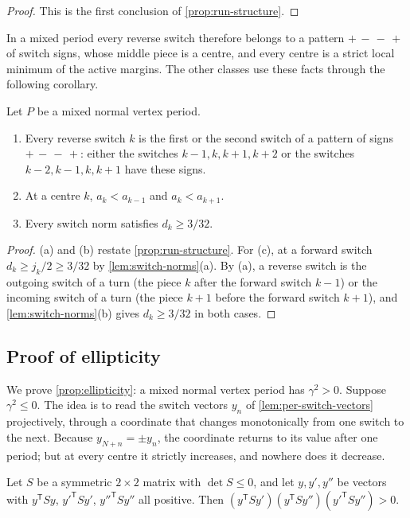 \begin{proof}
This is the first conclusion of \cref{prop:run-structure}.
\end{proof}

In a mixed period every reverse switch therefore belongs to a pattern $+\,-\,-\,+$ of switch
signs, whose middle piece is a centre, and every centre is a strict local minimum of the active
margins. The other classes use these facts through the following corollary.

\begin{corollary}\label{cor:rev-mixed}
Let $P$ be a mixed normal vertex period.
\begin{enumerate}[label=\textup{(\alph*)}]
\item Every reverse switch $k$ is the first or the second switch of a pattern of signs
  $+\,-\,-\,+$: either the switches $k-1,k,k+1,k+2$ or the switches $k-2,k-1,k,k+1$ have these
  signs.
\item At a centre $k$, $a_k<a_{k-1}$ and $a_k<a_{k+1}$.
\item Every switch norm satisfies $d_k\ge3/32$.
\end{enumerate}
\end{corollary}

\begin{proof}
(a) and (b) restate \cref{prop:run-structure}. For (c), at a forward switch
$d_k\ge j_k/2\ge3/32$ by \cref{lem:switch-norms}(a). By (a), a reverse switch is the outgoing
switch of a turn (the piece $k$ after the forward switch $k-1$) or the incoming switch of a turn
(the piece $k+1$ before the forward switch $k+1$), and \cref{lem:switch-norms}(b) gives
$d_k\ge3/32$ in both cases.
\end{proof}

\subsection{Proof of ellipticity}\label{sec:rev-ellipticity}

We prove \cref{prop:ellipticity}: a mixed normal vertex period has $\gamma^2>0$. Suppose
$\gamma^2\le0$. The idea is to read the switch vectors $y_n$ of \cref{lem:per-switch-vectors}
projectively, through a coordinate that changes monotonically from one switch to the next.
Because $y_{N+n}=\pm y_n$, the coordinate returns to its value after one period; but at every
centre it strictly increases, and nowhere does it decrease.

\begin{lemma}\label{lem:rev-three-gram}
Let $S$ be a symmetric $2\times2$ matrix with $\det S\le0$, and let $y,y',y''$ be vectors with
$y^{\mathsf T}Sy$, $y'^{\mathsf T}Sy'$, $y''^{\mathsf T}Sy''$ all positive. Then
$(y^{\mathsf T}Sy')(y^{\mathsf T}Sy'')(y'^{\mathsf T}Sy'')>0$.
\end{lemma}

